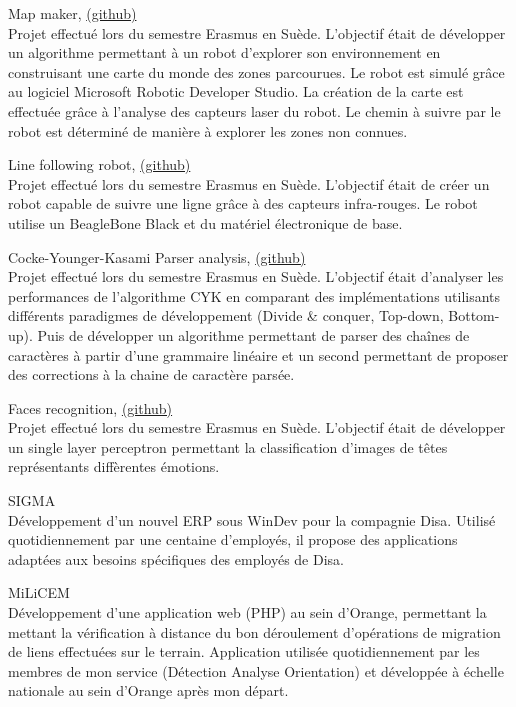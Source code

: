 {\large Map maker, \href{https://github.com/ThomasRanvier/map_maker}{(github)}}
\\
{\small Projet effectu\'e lors du semestre Erasmus en Su\`ede. 
L'objectif \'etait de d\'evelopper un algorithme permettant \`a un robot d'explorer son environnement en construisant une carte du monde des zones parcourues.
Le robot est simul\'e gr\^ace au logiciel Microsoft Robotic Developer Studio.
La cr\'eation de la carte est effectu\'ee gr\^ace \`a l'analyse des capteurs laser du robot.
Le chemin \`a suivre par le robot est d\'etermin\'e de mani\`ere \`a explorer les zones non connues.}

\medskip
    
{\large Line following robot, \href{https://github.com/ThomasRanvier/line_following_robot}{(github)}}
\\
{\small Projet effectu\'e lors du semestre Erasmus en Su\`ede. 
L'objectif \'etait de cr\'eer un robot capable de suivre une ligne gr\^ace \`a des capteurs infra-rouges.
Le robot utilise un BeagleBone Black et du mat\'eriel \'electronique de base.}

\medskip

{\large Cocke-Younger-Kasami Parser analysis, \href{https://github.com/ThomasRanvier/cyk_algorithm_analysis}{(github)}}
\\
{\small Projet effectu\'e lors du semestre Erasmus en Su\`ede. 
L'objectif \'etait d'analyser les performances de l'algorithme CYK en comparant des impl\'ementations utilisants diff\'erents paradigmes de d\'eveloppement (Divide \& conquer, Top-down, Bottom-up).
Puis de d\'evelopper un algorithme permettant de parser des cha\^ines de caract\`eres \`a partir d'une grammaire lin\'eaire et un second permettant de proposer des corrections \`a la chaine de caract\`ere pars\'ee.}

\medskip

{\large Faces recognition, \href{https://github.com/ThomasRanvier/faces_recognition_nn}{(github)}}
\\
{\small Projet effectu\'e lors du semestre Erasmus en Su\`ede.
L'objectif \'etait de d\'evelopper un single layer perceptron permettant la classification d'images de t\^etes représentants diff\`erentes \'emotions.}

\medskip

{\large SIGMA}
\\
{\small D\'eveloppement d'un nouvel ERP sous WinDev pour la compagnie Disa.
Utilis\'e quotidiennement par une centaine d'employ\'es, il propose des applications adapt\'ees aux besoins sp\'ecifiques des employ\'es de Disa.}

\medskip

{\large MiLiCEM}
\\
{\small D\'eveloppement d'une application web (PHP) au sein d'Orange, permettant la mettant la vérification à distance du bon d\'eroulement d'op\'erations de migration de liens effectu\'ees sur le terrain.
Application utilis\'ee quotidiennement par les membres de mon service (D\'etection Analyse Orientation) et d\'evelopp\'ee \`a \'echelle nationale au sein d'Orange apr\`es mon d\'epart.}

\medskip
